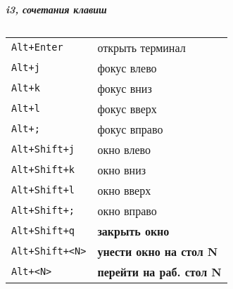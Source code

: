 




\raggedright
\footnotesize

\begin{center}
    \Large{\textbf{\textit{i3, сочетания клавиш}}} \\
\end{center}
\vspace*{0.5cm}

\begin{multicols}{3}


\setlength{\premulticols}{1pt}
\setlength{\postmulticols}{1pt}
\setlength{\multicolsep}{1pt}
\setlength{\columnsep}{2pt}

\section{}
\begin{tabular}{@{}ll@{}}
    \verb!Alt+Enter! &  открыть терминал \\
    \verb!Alt+j! & фокус влево \\
    \verb!Alt+k! & фокус вниз \\
    \verb!Alt+l! & фокус вверх \\
    \verb!Alt+;! & фокус вправо \\
    \verb!Alt+Shift+j! & окно влево \\
    \verb!Alt+Shift+k! & окно вниз \\
    \verb!Alt+Shift+l! & окно вверх \\
    \verb!Alt+Shift+;! & окно вправо \\
    \verb!Alt+Shift+q! & \textbf{закрыть окно} \\
    \verb!Alt+Shift+<N>! & \textbf{унести окно на стол N} \\
    \verb!Alt+<N>! & \textbf{перейти на раб. стол N} \\
\end{tabular}


\end{multicols}
